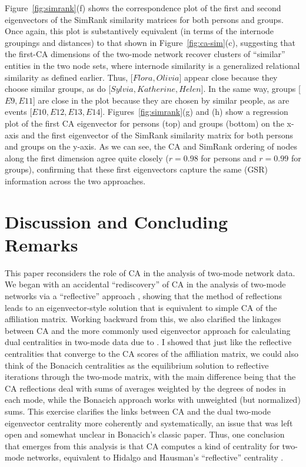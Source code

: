 \documentclass[a4paper,fleqn]{cas-sc}
\begin{document}
Figure~\ref{fig:simrank}(f) shows the correspondence plot of the first and second eigenvectors of the SimRank similarity matrices for both persons and groups. Once again, this plot is substantively equivalent (in terms of the internode groupings and distances) to that shown in Figure~\ref{fig:ca-sim}(c), suggesting that the first-CA dimensions of the two-mode network recover clusters of ``similar'' entities in the two node sets, where internode similarity is a generalized relational similarity as defined earlier. Thus, [$Flora, Olivia$] appear close because they choose similar groups, as do [$Sylvia, Katherine, Helen$]. In the same way, groups [$E9, E11$] are close in the plot because they are chosen by similar people, as are events [$E10, E12, E13, E14$]. Figures~\ref{fig:simrank}(g) and (h) show a regression plot of the first CA eigenvector for persons (top) and groups (bottom) on the x-axis and the first eigenvector of the SimRank similarity matrix for both persons and groups on the y-axis. As we can see, the CA and SimRank ordering of nodes along the first dimension agree quite closely ($r = 0.98$ for persons and $r = 0.99$ for groups), confirming that these first eigenvectors capture the same (GSR) information across the two approaches. 

\section{Discussion and Concluding Remarks} \label{sec:disc}
This paper reconsiders the role of CA in the analysis of two-mode network data. We began with an accidental ``rediscovery'' of CA in the analysis of two-mode networks via a ``reflective'' approach \citep{hidalgo2009building}, showing that the method of reflections leads to an eigenvector-style solution that is equivalent to simple CA of the affiliation matrix. Working backward from this, we also clarified the linkages between CA and the more commonly used eigenvector approach for calculating dual centralities in two-mode data due to \citet{bonacich1991simultaneous}. I showed that just like the reflective centralities that converge to the CA scores of the affiliation matrix, we could also think of the Bonacich centralities as the equilibrium solution to reflective iterations through the two-mode matrix, with the main difference being that the CA reflections deal with sums of averages weighted by the degrees of nodes in each mode, while the Bonacich approach works with unweighted (but normalized) sums. This exercise clarifies the links between CA and the dual two-mode eigenvector centrality more coherently and systematically, an issue that was left open and somewhat unclear in Bonacich's \citeyearpar{bonacich1991simultaneous} classic paper. Thus, one conclusion that emerges from this analysis is that CA computes a kind of centrality for two-mode networks, equivalent to Hidalgo and Hausman's ``reflective'' centrality \citep{van2021correspondence}.
\end{document}

